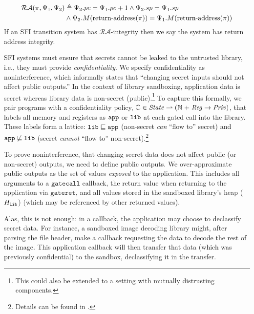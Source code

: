 \begin{definition}
  \begin{align*}
    \mathcal{RA}(\pi, \Psi_1, \Psi_2) &\triangleq \Psi_2.pc = \Psi_1.pc + 1 \wedge \Psi_2.sp = \Psi_1.sp \\
    & \wedge \Psi_2.M(\operatorname{return-address}(\pi)) = \Psi_1.M(\operatorname{return-address}(\pi))
  \end{align*}
  If an SFI transition system has $\mathcal{RA}$-integrity then we say the system has return address integrity.
\end{definition}


%
SFI systems must ensure that secrets cannot be leaked to the untrusted
library, i.e., they must provide \emph{confidentiality}.
%
We specify confidentiality as noninterference, which informally states that
``changing secret inputs should not affect public outputs.''
%
In the context of library sandboxing, application data is secret whereas
library data is non-secret (public).\footnote{This could also be extended to
a setting with mutually distrusting components.}
%
To capture this formally, we pair programs with a confidentiality policy,
$\mathbb{C} \in \mathit{State} \rightharpoonup (\mathbb{N} \mathrel{+} \mathit{Reg} \rightarrow
\mathit{Priv})$, that labels all memory and registers as $\mathtt{app}$ or $\mathtt{lib}$ at
each gated call into the library.
%
These labels form a lattice:
$\mathtt{lib} \sqsubseteq \mathtt{app}$ (non-secret \emph{can} ``flow to'' secret)
and $\mathtt{app} \not\sqsubseteq \mathtt{lib}$ (secret \emph{cannot} ``flow to''
non-secret).\footnote{Details can be found in
.}
%

To prove noninterference, that changing secret data does not affect public (or
non-secret) outputs, we need to define public outputs.
%
We over-approximate public outputs as the set of values \emph{exposed} to the
application.
%
This includes all arguments to a $\mathtt{gatecall}$ callback, the return value
when returning to the application via $\mathtt{gateret}$, and all values
stored in the sandboxed library's heap ($H_{\mathtt{lib}}$) (which may be
referenced by other returned values).

Alas, this is not enough: in a callback, the application may choose to
declassify secret data.
%
For instance, a sandboxed image decoding library might, after parsing the file
header, make a callback requesting the data to decode the rest of the image.
%
This application callback will then transfer that data (which was previously
confidential) to the sandbox, declassifying it in the transfer.

